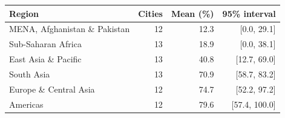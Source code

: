 \begin{tabular}{lrrr}
\toprule
Region & Cities & Mean (\%) & 95\% interval \\
\midrule
MENA, Afghanistan \& Pakistan & 12 & 12.3 & [0.0, 29.1] \\
Sub-Saharan Africa & 13 & 18.9 & [0.0, 38.1] \\
East Asia \& Pacific & 13 & 40.8 & [12.7, 69.0] \\
South Asia & 13 & 70.9 & [58.7, 83.2] \\
Europe \& Central Asia & 12 & 74.7 & [52.2, 97.2] \\
Americas & 12 & 79.6 & [57.4, 100.0] \\
\bottomrule
\end{tabular}

